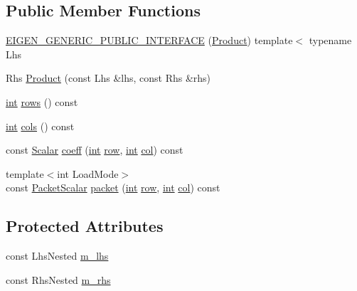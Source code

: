 \subsection*{Public Member Functions}
\begin{DoxyCompactItemize}
\item 
\hyperlink{class_product_3_01_lhs_nested_00_01_rhs_nested_00_01_diagonal_product_01_4_a9e9f9c2787e21ebe9f34389c231a7065}{E\-I\-G\-E\-N\-\_\-\-G\-E\-N\-E\-R\-I\-C\-\_\-\-P\-U\-B\-L\-I\-C\-\_\-\-I\-N\-T\-E\-R\-F\-A\-C\-E} (\hyperlink{class_product}{Product}) template$<$ typename Lhs
\item 
Rhs \hyperlink{class_product_3_01_lhs_nested_00_01_rhs_nested_00_01_diagonal_product_01_4_a257134c6454f730923ee7054be60f25c}{Product} (const Lhs \&lhs, const Rhs \&rhs)
\item 
\hyperlink{ioapi_8h_a787fa3cf048117ba7123753c1e74fcd6}{int} \hyperlink{class_product_3_01_lhs_nested_00_01_rhs_nested_00_01_diagonal_product_01_4_ad91e1da0fe31bafc7537b19af916c794}{rows} () const 
\item 
\hyperlink{ioapi_8h_a787fa3cf048117ba7123753c1e74fcd6}{int} \hyperlink{class_product_3_01_lhs_nested_00_01_rhs_nested_00_01_diagonal_product_01_4_abf6514db56d451571fc56b2995ccba8a}{cols} () const 
\item 
const \hyperlink{class_matrix_base_a625df8339dc2d816cbc0fd66e7dadaf5}{Scalar} \hyperlink{class_product_3_01_lhs_nested_00_01_rhs_nested_00_01_diagonal_product_01_4_a208b5a7be1a0f260f54b134b21022ad7}{coeff} (\hyperlink{ioapi_8h_a787fa3cf048117ba7123753c1e74fcd6}{int} \hyperlink{glext_8h_a11b277b422822f784ee248b43eee3e1e}{row}, \hyperlink{ioapi_8h_a787fa3cf048117ba7123753c1e74fcd6}{int} \hyperlink{class_matrix_base_ae3c94b0f25b4273c7a8125169bdf60e0}{col}) const 
\item 
{\footnotesize template$<$int Load\-Mode$>$ }\\const \hyperlink{class_matrix_base_a58f32cd6a06433ee7a60efa03e99183a}{Packet\-Scalar} \hyperlink{class_product_3_01_lhs_nested_00_01_rhs_nested_00_01_diagonal_product_01_4_a5ebfd5bb6ed8d10c4fc815e814c2c251}{packet} (\hyperlink{ioapi_8h_a787fa3cf048117ba7123753c1e74fcd6}{int} \hyperlink{glext_8h_a11b277b422822f784ee248b43eee3e1e}{row}, \hyperlink{ioapi_8h_a787fa3cf048117ba7123753c1e74fcd6}{int} \hyperlink{class_matrix_base_ae3c94b0f25b4273c7a8125169bdf60e0}{col}) const 
\end{DoxyCompactItemize}
\subsection*{Protected Attributes}
\begin{DoxyCompactItemize}
\item 
const Lhs\-Nested \hyperlink{class_product_3_01_lhs_nested_00_01_rhs_nested_00_01_diagonal_product_01_4_afb1a2164347ac0a6692236cb769ca92f}{m\-\_\-lhs}
\item 
const Rhs\-Nested \hyperlink{class_product_3_01_lhs_nested_00_01_rhs_nested_00_01_diagonal_product_01_4_a9b0d6a899babe8127a059c7e5922f575}{m\-\_\-rhs}
\end{DoxyCompactItemize}

